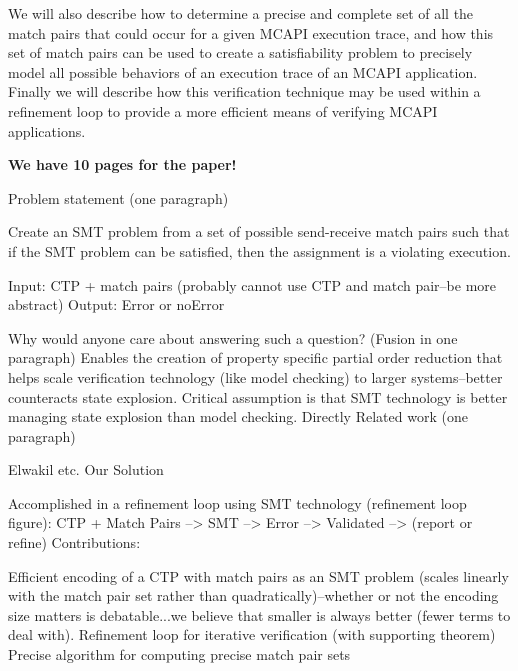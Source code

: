 We will also describe how to determine a precise and complete set of all the
match pairs that could occur for a given MCAPI execution trace, and how this
set of match pairs can be used to create a satisfiability problem to precisely
model all possible behaviors of an execution trace of an MCAPI application.
Finally we will describe how this verification technique may be used within a
refinement loop to provide a more efficient means of verifying MCAPI
applications.

\noindent\textbf{We have 10 pages for the paper!}

Problem statement (one paragraph)

Create an SMT problem from a set of possible send-receive match pairs
such that if the SMT problem can be satisfied, then the assignment is
a violating execution.

Input: CTP + match pairs (probably cannot use CTP and match pair--be
more abstract) Output: Error or noError

Why would anyone care about answering such a question? (Fusion in one
paragraph) Enables the creation of property specific partial order
reduction that helps scale verification technology (like model
checking) to larger systems--better counteracts state explosion.
Critical assumption is that SMT technology is better managing state
explosion than model checking.  Directly Related work (one paragraph)

Elwakil etc. 
Our Solution

Accomplished in a refinement loop using SMT technology (refinement
loop figure): CTP + Match Pairs --> SMT --> Error --> Validated -->
(report or refine) Contributions:

Efficient encoding of a CTP with match pairs as an SMT problem (scales
linearly with the match pair set rather than quadratically)--whether
or not the encoding size matters is debatable...we believe that
smaller is always better (fewer terms to deal with).  Refinement loop
for iterative verification (with supporting theorem) Precise algorithm
for computing precise match pair sets
